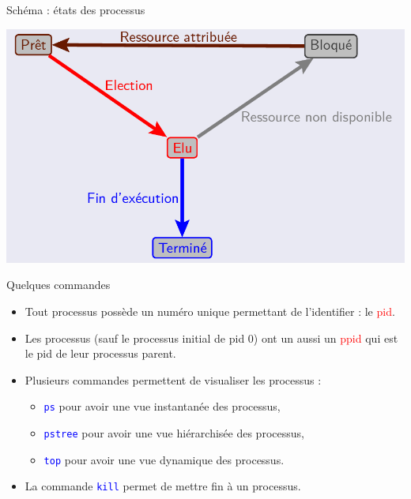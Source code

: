 \documentclass[10pt]{beamer}
\begin{document}
\begin{frame}
	\mframe{\Processus}
	\begin{block}{Schéma : états des processus}
			\begin{center}
		\includegraphics[scale=0.25]{../../Archi_Materielle/data/etats_processus_5}
		\end{center}
	\end{block}
\end{frame}

\begin{frame}
	\mframe{\Processus}
	\begin{block}{Quelques commandes}
		\begin{itemize}
			\item<2-> Tout processus possède un numéro unique permettant de l'identifier : le \textcolor{red}{{\sc pid}}.
			\item<3-> Les processus (sauf le processus initial de {\sc pid} 0) ont un aussi un \textcolor{red}{{\sc ppid}} qui est le {\sc pid} de leur processus parent.
			\item<4-> Plusieurs commandes permettent de visualiser les processus :
			\begin{itemize}
				\item<5-> \textcolor{blue}{\tt ps} pour avoir une vue instantanée des processus,
				\item<6-> \textcolor{blue}{\tt pstree} pour avoir une vue hiérarchisée des processus,
				\item<7-> \textcolor{blue}{\tt top} pour avoir une vue dynamique des processus.
			\end{itemize}
			\item<8-> La commande \textcolor{blue}{\tt kill} permet de mettre fin à un processus.
		\end{itemize}
	\end{block}
\end{frame}
\end{document}
